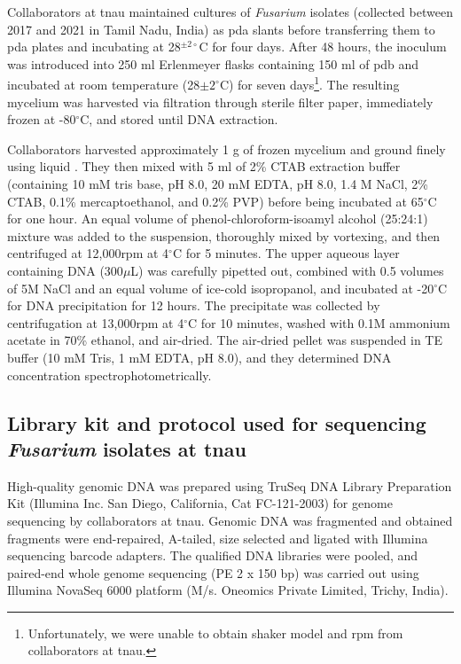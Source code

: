 Collaborators at \ac{tnau} maintained cultures of \textit{Fusarium} isolates (collected between 2017 and 2021 in Tamil Nadu, India) as \acf{pda} slants before transferring them to \acf{pda} plates and incubating at 28$^{\pm 2\circ}$C for four days. After 48 hours, the inoculum was introduced into 250 ml Erlenmeyer flasks containing 150 ml of \ac{pdb} and incubated at room temperature (28${\pm 2^\circ}$C) for seven days\footnote{Unfortunately, we were unable to obtain shaker model and rpm from collaborators at \acf{tnau}.}. The resulting mycelium was harvested via filtration through sterile filter paper, immediately frozen at -80$^\circ$C, and stored until DNA extraction. 

Collaborators harvested approximately 1 g of frozen mycelium and ground finely using liquid . They then mixed with 5 ml of 2\% CTAB extraction buffer (containing 10 mM tris base, pH 8.0, 20 mM EDTA, pH 8.0, 1.4 M NaCl, 2\% CTAB, 0.1\% mercaptoethanol, and 0.2\% PVP) before being incubated at 65$^\circ$C for one hour. An equal volume of phenol-chloroform-isoamyl alcohol (25:24:1) mixture was added to the suspension, thoroughly mixed by vortexing, and then centrifuged at 12,000rpm at 4$^\circ$C for 5 minutes. The upper aqueous layer containing DNA (300\(\mu\)L) was carefully pipetted out, combined with 0.5 volumes of 5M NaCl and an equal volume of ice-cold isopropanol, and incubated at -20$^\circ$C for DNA precipitation for 12 hours. The precipitate was collected by centrifugation at 13,000rpm at 4$^\circ$C for 10 minutes, washed with 0.1M ammonium acetate in 70\% ethanol, and air-dried. The air-dried pellet was suspended in TE buffer (10 mM Tris, 1 mM EDTA, pH 8.0), and they determined DNA concentration spectrophotometrically.

\subsection{Library kit and protocol used for sequencing \textit{Fusarium} isolates at \ac{tnau}}

High-quality genomic DNA was prepared using TruSeq DNA Library Preparation Kit (Illumina Inc. San Diego, California, Cat FC-121-2003) for genome sequencing by collaborators at \ac{tnau}. Genomic DNA was fragmented and obtained fragments were end-repaired, A-tailed, size selected and ligated with Illumina sequencing barcode adapters. The qualified DNA libraries were pooled, and paired-end whole genome sequencing (PE 2 x 150 bp) was carried out using Illumina NovaSeq 6000 platform (M/s. Oneomics Private Limited, Trichy, India). 

